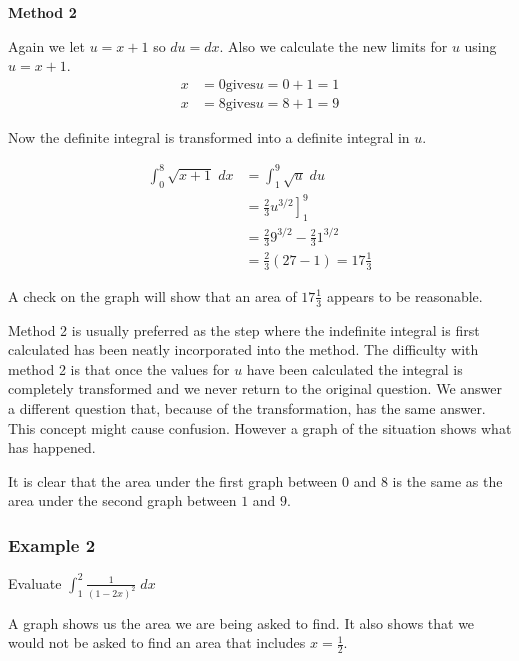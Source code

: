 \textbf{Method 2} 

Again we let $u =x +1$ so $d u =d x$. Also we calculate the new limits for $u$ using $u =x +1$.
\begin{align*}x &  = 0\text{gives}u =0 +1 =1 \\
x &  = 8\text{gives}u =8 +1 =9\end{align*}

Now the definite integral is transformed into a definite integral in $u$. 


\begin{align*}\int _{0}^{8}\sqrt{x +1}\; d x &  = \int _{1}^{9}\sqrt{u}\; d u \\
 &  = \left .\frac{2}{3} u^{3/2}\right ]_{1}^{9} \\
 &  = \frac{2}{3} 9^{3/2} -\frac{2}{3} 1^{3/2} \\
 &  = \frac{2}{3} \left (27 -1\right ) =17\frac{1}{3}\end{align*}

A check on the graph will show that an area of $17\frac{1}{3}$ appears to be reasonable. 

Method 2 is usually preferred as the step where the indefinite integral is first calculated
has been neatly incorporated into the method. The difficulty with method 2 is that once the values for $u$ have been calculated the integral is completely transformed and we never return to the original question. We
answer a different question that, because of the transformation, has the same answer. This concept might cause
confusion. However a graph of the situation shows what has happened. 

   
\setlength\fboxrule{0.01in}\setlength\fboxsep{0.2in}


It is clear that the area under the first graph between $0$ and $8$ is the same as the area under the second graph between $1$ and $9$. 

\subsubsection{Example 2}
Evaluate $\int _{1}^{2}\frac{1}{\left (1 -2 x\right )^{2}}\; d x$ 

A graph shows us the area we are being asked to find. It also shows
that we would not be asked to find an area that includes $x =\frac{1}{2}$. 

   
\setlength\fboxrule{0.01in}\setlength\fboxsep{0.2in}


